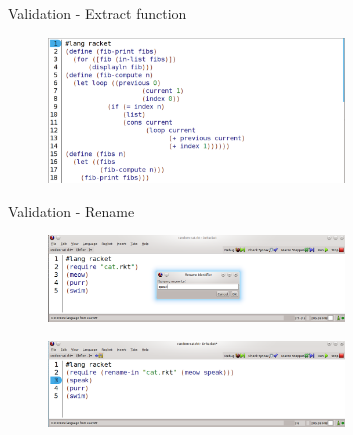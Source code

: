 \documentclass[xcolor=dvipsnames]{beamer}
\begin{document}
\begin{frame}{Validation - Extract function}
\begin{figure}[htbp]
  \centering
  \includegraphics[width=0.7\textwidth]{img/fibonacci-extracted-compute.png}
  \label{fig:fib-extract-two}
\end{figure}
\end{frame}
\begin{frame}{Validation - Rename}
\begin{figure}[htbp]
  \centering
  \includegraphics[width=0.7\textwidth]{img/renameV2-Correct-1.png}
  \label{fig:RenameCorrectBefore}
\end{figure}

\begin{figure}[htbp]
  \centering
  \includegraphics[width=0.7\textwidth]{img/renameV2-Correct-2.png}
  \label{fig:RenameCorrectAfter}
\end{figure}
\end{frame}
\end{document}
